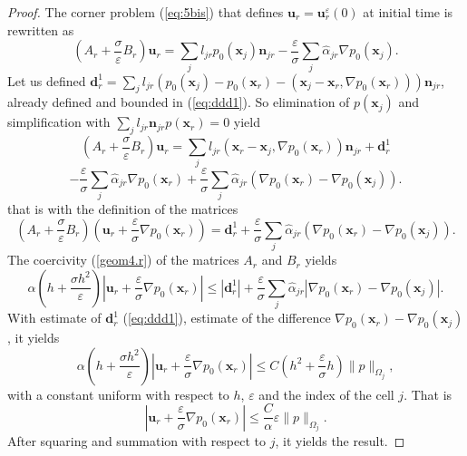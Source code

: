 \documentclass[a4paper,french,english,10pt]{article}
\newcommand\ljr{l_{jr}}
\newcommand\njr{\mathbf{n}_{jr}}
\newcommand\uu{\mathbf{u}}
\newcommand\eps{\varepsilon}
\newcommand\alj{\widehat{\alpha}_{jr}}
\newcommand\ur{\uu_r}
\begin{document}
\begin{proof}
The corner problem (\ref{eq:5bis})
that defines $\mathbf u_r=\mathbf u_r^\eps(0)$ at initial time is rewritten as
$$
\displaystyle \left( A_r+ 
\frac{\sigma}{\varepsilon} B_r\right)\ur= \sum_{j}\ljr
p_0(\mathbf x_j)\njr-\frac\eps\sigma \sum_j\alj \nabla p_0(\mathbf x_j).
$$%
Let us defined 
$
\mathbf d_{r}^1= \sum_{j}\ljr  \left(
 p_0(\mathbf x_j)-p_0(\mathbf x_r) -  \left( \mathbf x_j - \mathbf x_r, \nabla p_0(\mathbf x_r)   \right) \right)
 \njr
$,
already defined and bounded  in (\ref{eq:ddd1}).
So elimination of $p(\mathbf x_j)$ and simplification with $\sum_j \ljr \njr p(\mathbf x_r)=0$ yield
$$
\displaystyle \left( A_r+ 
\frac{\sigma}{\varepsilon}B_r\right)\ur= \sum_{j}\ljr
\left( \mathbf x_r - \mathbf x_j, \nabla p_0(\mathbf x_r) \right)\njr+ \mathbf d_r^1
$$
$$
-\frac\eps\sigma \sum_j\alj \nabla p_0(\mathbf x_r)  +  \frac\eps\sigma \sum_j\alj \left( \nabla p_0(\mathbf x_r) 
-
 \nabla p_0(\mathbf x_j) \right) .
$$
that is with the definition of the matrices
$$
\displaystyle \left( A_r+ 
\frac{\sigma}{\varepsilon}B_r\right)\left(   \ur  +\frac\eps \sigma \nabla p_0(\mathbf x_r) \right)
=\mathbf d_r^1+  \frac\eps\sigma \sum_j\alj \left( \nabla p_0(\mathbf x_r) 
-
 \nabla p_0(\mathbf x_j) \right) .
$$
The coercivity (\ref{geom4.r}) of the matrices $A_r$ and $B_r$ yields  
$$
\alpha \left(h +\frac{\sigma h^2}\eps \right)\left|    \ur  +\frac\eps \sigma \nabla p_0(\mathbf x_r)   \right| 
\leq | \mathbf d_r^1 |+
\frac\eps\sigma \sum_j\alj \left| \nabla p_0(\mathbf x_r) 
-
 \nabla p_0(\mathbf x_j) \right|.
$$
 With estimate of $\mathbf d_r^1$  (\ref{eq:ddd1}), estimate of the difference $\nabla p_0(\mathbf x_r) 
-
 \nabla p_0(\mathbf x_j) $,   it yields
 $$
 \alpha \left(h +\frac{\sigma h^2}\eps \right)\left|    \ur  +\frac\eps \sigma \nabla p_0(\mathbf x_r)   \right| 
\leq
C ( h^2  + \frac\eps \sigma h)  \|  p  \|_{\Omega_j}, 
 $$
 with a constant uniform with respect to $h$, $\eps$ and the index of the cell $j$.
 That is
 $$
 \left|    \ur  +\frac\eps \sigma \nabla p_0(\mathbf x_r)   \right|  \leq \frac C\alpha \eps  \|  p  \|_{\Omega_j}.
 $$
 After squaring and summation with respect to $j$, it yields the result.
\end{proof}
\end{document}
